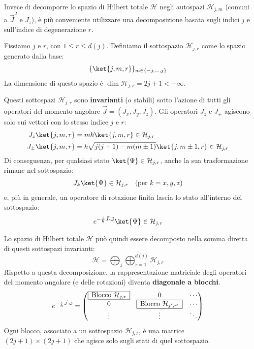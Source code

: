 Invece di decomporre lo spazio di Hilbert totale \(\mathcal{H}\) negli autospazi \(\mathcal{H}_{j,m}\) (comuni a \(\vec{J}^2\) e \(J_z\)), è più conveniente utilizzare una decomposizione basata sugli indici \(j\) e sull'indice di degenerazione \(r\).

Fissiamo \(j\) e \(r\), con \(1 \le r \le d(j)\). Definiamo il sottospazio \(\mathcal{H}_{j,r}\) come lo spazio generato dalla base:
\[
    \{ \ket{j, m, r} \}_{m \in \{-j, \dots, j\}}
\]
La dimensione di questo spazio è \(\dim \mathcal{H}_{j,r} = 2j+1 < +\infty\).

Questi sottospazi \(\mathcal{H}_{j,r}\) sono \textbf{invarianti} (o stabili) sotto l'azione di tutti gli operatori del momento angolare \(\vec{J} = (J_x, J_y, J_z)\).
Gli operatori \(J_z\) e \(J_\pm\) agiscono solo sui vettori con lo stesso indice \(j\) e \(r\):
\begin{align*}
    J_z \ket{j, m, r} &= m\hbar \ket{j, m, r} \in \mathcal{H}_{j,r} \\
    J_\pm \ket{j, m, r} &= \hbar \sqrt{j(j+1) - m(m\pm 1)} \ket{j, m\pm 1, r} \in \mathcal{H}_{j,r}
\end{align*}
Di conseguenza, per qualsiasi stato \(\ket{\Psi} \in \mathcal{H}_{j,r}\), anche la sua trasformazione rimane nel sottospazio:
\[
    J_k \ket{\Psi} \in \mathcal{H}_{j,r} \quad (\text{per } k=x,y,z)
\]
e, più in generale, un operatore di rotazione finita lascia lo stato all'interno del sottospazio:
\[
    e^{-\frac{i}{\hbar} \vec{J} \cdot \vec{\omega}} \ket{\Psi} \in \mathcal{H}_{j,r}
\]

Lo spazio di Hilbert totale \(\mathcal{H}\) può quindi essere decomposto nella somma diretta di questi sottospazi invarianti:
\[
    \mathcal{H} = \bigoplus_j \bigoplus_{r=1}^{d(j)} \mathcal{H}_{j,r}
\]
Rispetto a questa decomposizione, la rappresentazione matriciale degli operatori del momento angolare (e delle rotazioni) diventa \textbf{diagonale a blocchi}. 
\[
e^{-\frac{i}{\hbar} \vec{J} \cdot \vec{\omega}} =
\begin{pmatrix}
    \begin{array}{|c|}
    \hline
    \text{Blocco } \mathcal{H}_{j,r} \\
    \hline
    \end{array}
    & 0 & \cdots \\
    0 &
    \begin{array}{|c|}
    \hline
    \text{Blocco } \mathcal{H}_{j',r'} \\
    \hline
    \end{array}
    & \cdots \\
    \vdots & \vdots & \ddots
\end{pmatrix}
\]
Ogni blocco, associato a un sottospazio \(\mathcal{H}_{j,r}\), è una matrice \((2j+1) \times (2j+1)\) che agisce solo sugli stati di quel sottospazio.

